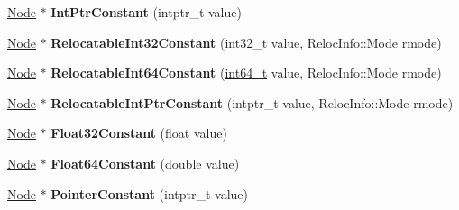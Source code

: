 \begin{DoxyCompactItemize}
\mbox{\hyperlink{classv8_1_1internal_1_1compiler_1_1Node}{Node}} $\ast$ {\bfseries Int\+Ptr\+Constant} (intptr\+\_\+t value)
\item 
\mbox{\label{classv8_1_1internal_1_1compiler_1_1MachineGraph_ad35fba1e4b5ae9a4f75674d763ddae83}} 
\mbox{\hyperlink{classv8_1_1internal_1_1compiler_1_1Node}{Node}} $\ast$ {\bfseries Relocatable\+Int32\+Constant} (int32\+\_\+t value, Reloc\+Info\+::\+Mode rmode)
\item 
\mbox{\label{classv8_1_1internal_1_1compiler_1_1MachineGraph_a0c3073bb8fd24c51462354d6e618be8f}} 
\mbox{\hyperlink{classv8_1_1internal_1_1compiler_1_1Node}{Node}} $\ast$ {\bfseries Relocatable\+Int64\+Constant} (\mbox{\hyperlink{classint64__t}{int64\+\_\+t}} value, Reloc\+Info\+::\+Mode rmode)
\item 
\mbox{\label{classv8_1_1internal_1_1compiler_1_1MachineGraph_a9e736ffac6d9b29d15fca072a7776b91}} 
\mbox{\hyperlink{classv8_1_1internal_1_1compiler_1_1Node}{Node}} $\ast$ {\bfseries Relocatable\+Int\+Ptr\+Constant} (intptr\+\_\+t value, Reloc\+Info\+::\+Mode rmode)
\item 
\mbox{\label{classv8_1_1internal_1_1compiler_1_1MachineGraph_ae7e5a4e7bebd38767ea6684662d81d40}} 
\mbox{\hyperlink{classv8_1_1internal_1_1compiler_1_1Node}{Node}} $\ast$ {\bfseries Float32\+Constant} (float value)
\item 
\mbox{\label{classv8_1_1internal_1_1compiler_1_1MachineGraph_a37bdfa71d709bdf864a480d462d2a631}} 
\mbox{\hyperlink{classv8_1_1internal_1_1compiler_1_1Node}{Node}} $\ast$ {\bfseries Float64\+Constant} (double value)
\item 
\mbox{\label{classv8_1_1internal_1_1compiler_1_1MachineGraph_af1c5f9a48db40f48b08b652e8c0563c3}} 
\mbox{\hyperlink{classv8_1_1internal_1_1compiler_1_1Node}{Node}} $\ast$ {\bfseries Pointer\+Constant} (intptr\+\_\+t value)
\item 
\mbox{\label{classv8_1_1internal_1_1compiler_1_1MachineGraph_aec587b6fd683408f9fe11dc911187663}} 

\end{DoxyCompactItemize}
